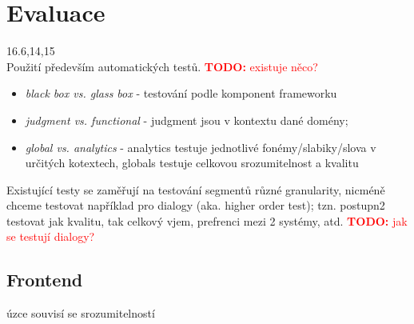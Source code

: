 \documentclass{article}
\newcommand{\td}[1]{\textcolor{red}{\textbf{TODO:} #1}}
\begin{document}
\section*{Evaluace}\cite{huang2001spoken}16.6,14,15 \\
Použití především automatických testů. \td{existuje něco?}
\begin{itemize}
\item\textit{black box vs. glass box} - testování podle komponent frameworku
\item \textit{judgment vs. functional} - judgment jsou v kontextu dané domény;
\item\textit{global vs. analytics} - analytics testuje jednotlivé fonémy/slabiky/slova v určitých kotextech, globals testuje celkovou srozumitelnost a kvalitu
\end{itemize}
Existující testy se zaměřují na testování segmentů různé granularity, nicméně chceme testovat například pro dialogy (aka. higher order test); tzn. postupn2 testovat jak kvalitu, tak celkový vjem, prefrenci mezi 2 systémy, atd. \td{jak se testují dialogy?}
\subsection*{Frontend} úzce souvisí se srozumitelností
\end{document}
